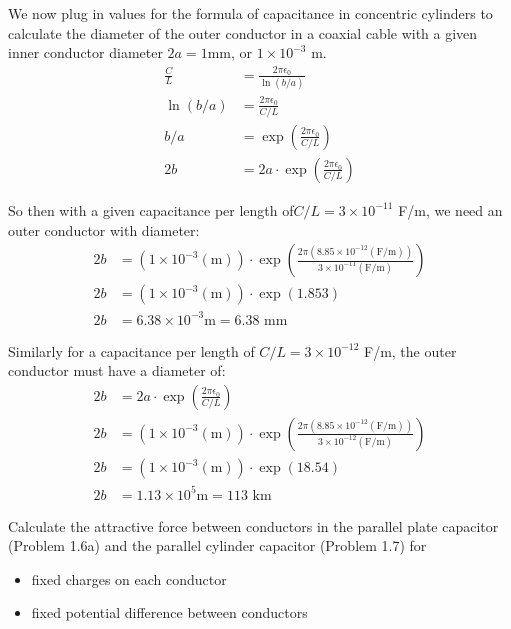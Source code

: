 \documentclass{article}
\begin{document}
We now plug in values for the formula of capacitance in concentric cylinders to calculate the diameter of the outer conductor in a coaxial cable with a given inner conductor diameter $2a = 1$mm, or $1\times 10^{-3}$ m.
\begin{align*}
\frac{C}{L} &= \frac{2\pi\epsilon_{0}}{\ln (b/a)}\\
\ln (b/a) &= \frac{2\pi\epsilon_{0}}{C/L}\\
b/a &= \exp\left(\frac{2\pi\epsilon_{0}}{C/L}\right)\\
2b &= 2a\cdot\exp\left(\frac{2\pi\epsilon_{0}}{C/L}\right)
\end{align*}

So then with a given capacitance per length of$C/L = 3\times 10^{-11}$ F/m, we need an outer conductor with diameter:\\
\begin{align*}
2b &= (1\times 10^{-3}(\text{m})) \cdot \exp\left( \frac{2\pi(8.85\times 10^{-12}(\text{F/m}))}{3\times 10^{-11}(\text{F/m})} \right)\\
2b &= (1\times 10^{-3}(\text{m})) \cdot \exp\left( 1.853 \right)\\
2b &= 6.38 \times 10^{-3}\text{m} = \boxed{6.38\text{ mm}}
\end{align*}

Similarly for a capacitance per length of $C/L = 3\times 10^{-12}$ F/m, the outer conductor must have a diameter of:\\
\begin{align*}
2b &= 2a\cdot\exp\left(\frac{2\pi\epsilon_{0}}{C/L}\right)\\
2b &= (1\times 10^{-3}(\text{m})) \cdot \exp\left( \frac{2\pi(8.85\times 10^{-12}(\text{F/m}))}{3\times 10^{-12}(\text{F/m})} \right)\\
2b &= (1\times 10^{-3}(\text{m})) \cdot \exp\left( 18.54 \right)\\
2b &= 1.13 \times 10^{5}\text{m} = \boxed{113\text{ km}}
\end{align*}


\setcounter{problem}{8}
\begin{problem}
	Calculate the attractive force  between conductors in the parallel plate capacitor (Problem 1.6a) and the parallel cylinder capacitor (Problem 1.7) for
	\begin{itemize}
		\item fixed charges on each conductor
		\item fixed potential difference between conductors
	\end{itemize}
\end{problem}
\end{document}
